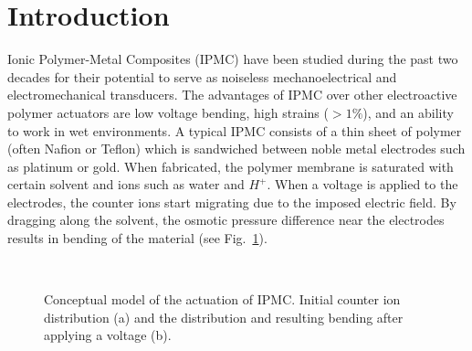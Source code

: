 \section{Introduction}

Ionic Polymer-Metal Composites (IPMC) have been studied during the past two 
decades for their potential to serve as noiseless mechanoelectrical and electromechanical transducers.
The advantages of IPMC over other electroactive polymer actuators
are low voltage bending, high strains ($>1\%$), and an ability to work
in wet environments. A typical IPMC consists of a thin sheet of polymer
(often Nafion or Teflon) which is sandwiched between noble
metal electrodes such as platinum or gold. When fabricated, the polymer 
membrane is saturated with certain solvent and ions such as water and $H^+$.
When a voltage is applied to the electrodes, the counter ions start
migrating due to the imposed electric field. By dragging along the solvent,
the osmotic pressure difference near the electrodes
results in bending of the material (see Fig.~\ref{fig:conceptual}).
\begin{figure}[!ht]
  \begin{centering}
    ~
  \par\end{centering}
  \caption{\label{fig:conceptual}Conceptual model of the actuation
 	of IPMC. Initial counter ion distribution (a) and
	the distribution and resulting bending after applying a voltage (b).}
\vspace{-1cm}
\end{figure}
